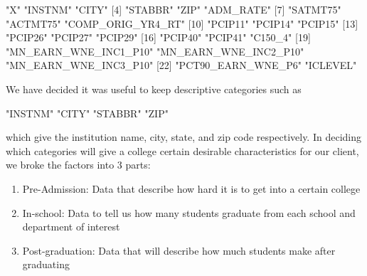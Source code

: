 \documentclass{article}
\begin{document}
\begin{Schunk}
\begin{Soutput}
 [1] "X"                    "INSTNM"               "CITY"                
 [4] "STABBR"               "ZIP"                  "ADM_RATE"            
 [7] "SATMT75"              "ACTMT75"              "COMP_ORIG_YR4_RT"    
[10] "PCIP11"               "PCIP14"               "PCIP15"              
[13] "PCIP26"               "PCIP27"               "PCIP29"              
[16] "PCIP40"               "PCIP41"               "C150_4"              
[19] "MN_EARN_WNE_INC1_P10" "MN_EARN_WNE_INC2_P10" "MN_EARN_WNE_INC3_P10"
[22] "PCT90_EARN_WNE_P6"    "ICLEVEL"             
\end{Soutput}
\end{Schunk}
We have decided it was useful to keep descriptive categories such as 
\begin{Schunk}
\begin{Soutput}
[1] "INSTNM" "CITY"   "STABBR" "ZIP"   
\end{Soutput}
\end{Schunk}
which give the institution name, city, state, and zip code respectively.  In deciding which categories will give a college certain desirable characteristics for our client, we broke the factors into 3 parts:

\begin{enumerate}
\item Pre-Admission: Data that describe how hard it is to get into a certain college
\item In-school: Data to tell us how many students graduate from each school and department of interest
\item Post-graduation: Data that will describe how much students make after graduating
\end{enumerate}
\end{document}
